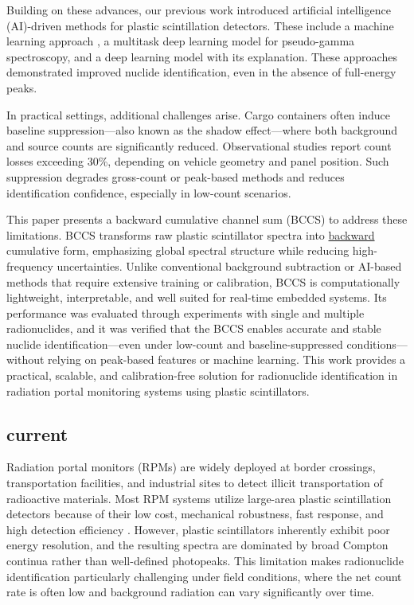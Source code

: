 \documentclass[10pt]{wlscirep}
\begin{document}
Building on these advances, our previous work introduced artificial intelligence (AI)-driven methods for plastic scintillation detectors. These include a machine learning approach \cite{Jeon2021CompML}, a multitask deep learning model for pseudo-gamma spectroscopy\cite{Jeon2021PseudoGamma}, and a deep learning model with its explanation\cite{Jeon2023Explanation}. These approaches demonstrated improved nuclide identification, even in the absence of full-energy peaks. 

In practical settings, additional challenges arise. Cargo containers often induce baseline suppression—also known as the shadow effect—where both background and source counts are significantly reduced. Observational studies report count losses exceeding 30\%, depending on vehicle geometry and panel position\cite{LoPresti2006BaselineSuppression}. Such suppression degrades gross-count or peak-based methods and reduces identification confidence, especially in low-count scenarios. 

This paper presents a backward cumulative channel sum (BCCS) to address these limitations. BCCS transforms raw plastic scintillator spectra into \ul{backward} cumulative form, emphasizing global spectral structure while reducing high-frequency uncertainties. Unlike conventional background subtraction or AI-based methods that require extensive training or calibration, BCCS is computationally lightweight, interpretable, and well suited for real-time embedded systems. Its performance was evaluated through experiments with single and multiple radionuclides, and it was verified that the BCCS enables accurate and stable nuclide identification—even under low-count and baseline-suppressed conditions—without relying on peak-based features or machine learning. This work provides a practical, scalable, and calibration-free solution for radionuclide identification in radiation portal monitoring systems using plastic scintillators.

\subsection*{current}
Radiation portal monitors (RPMs) are widely deployed at border crossings, transportation facilities, and industrial sites to detect illicit transportation of radioactive materials\cite{Sicilliano2005Comparision, Bertrand2014Current, Ely2006EWindow}. Most RPM systems utilize large-area plastic scintillation detectors because of their low cost, mechanical robustness, fast response, and high detection efficiency \cite{Hevener2013EWindow, Lee2020EWeight,Paff2017Spectral}. However, plastic scintillators inherently exhibit poor energy resolution, and the resulting spectra are dominated by broad Compton continua rather than well-defined photopeaks. This limitation makes radionuclide identification particularly challenging under field conditions, where the net count rate is often low and background radiation can vary significantly over time.
\end{document}
